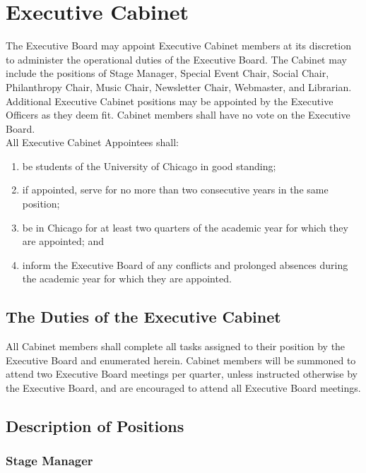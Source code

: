 \documentclass{article}
\begin{document}
\section{Executive Cabinet}

The Executive Board may appoint Executive Cabinet members at its discretion
to administer the operational duties of the Executive Board. The Cabinet
may include the positions of Stage Manager, Special Event Chair,
Social Chair, Philanthropy Chair, Music Chair, Newsletter Chair, Webmaster,
and Librarian. Additional Executive Cabinet positions may be appointed
by the Executive Officers as they deem fit. Cabinet members shall
have no vote on the Executive Board. \\
 All Executive Cabinet Appointees shall:
\begin{enumerate}
\item be students of the University of Chicago in good standing;
\item if appointed, serve for no more than two consecutive years in the
same position;
\item be in Chicago for at least two quarters of the academic year for which
they are appointed; and
\item inform the Executive Board of any conflicts and prolonged absences
during the academic year for which they are appointed.
\end{enumerate}

\subsection{The Duties of the Executive Cabinet}

All Cabinet members shall complete all tasks assigned to their position
by the Executive Board and enumerated herein. Cabinet members will
be summoned to attend two Executive Board meetings per quarter, unless
instructed otherwise by the Executive Board, and are encouraged to
attend all Executive Board meetings.

\subsection{Description of Positions}


\subsubsection{Stage Manager}
\end{document}
